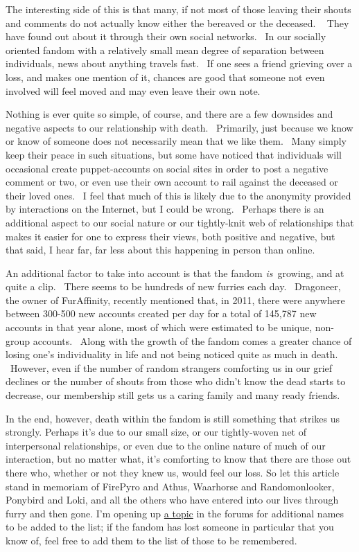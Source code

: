 The interesting side of this is that many, if not most of those leaving
their shouts and comments do not actually know either the bereaved or
the deceased. ~ They have found out about it through their own social
networks. ~In our socially oriented fandom with a relatively small mean
degree of separation between individuals, news about anything travels
fast. ~If one sees a friend grieving over a loss, and makes one mention
of it, chances are good that someone not even involved will feel moved
and may even leave their own note.

Nothing is ever quite so simple, of course, and there are a few
downsides and negative aspects to our relationship with death.
~Primarily, just because we know or know of someone does not necessarily
mean that we like them. ~Many simply keep their peace in such
situations, but some have noticed that individuals will occasional
create puppet-accounts on social sites in order to post a negative
comment or two, or even use their own account to rail against the
deceased or their loved ones. ~I feel that much of this is likely due to
the anonymity provided by interactions on the Internet, but I could be
wrong. ~Perhaps there is an additional aspect to our social nature or
our tightly-knit web of relationships that makes it easier for one to
express their views, both positive and negative, but that said, I hear
far, far less about this happening in person than online.

An additional factor to take into account is that the fandom
\emph{is}~growing, and at quite a clip. ~There seems to be hundreds of
new furries each day. ~Dragoneer, the owner of FurAffinity, recently
mentioned that, in 2011, there were anywhere between 300-500 new
accounts created per day for a total of 145,787 new accounts in that
year alone, most of which were estimated to be unique, non-group
accounts. ~Along with the growth of the fandom comes a greater chance of
losing one's individuality in life and not being noticed quite as much
in death. ~However, even if the number of random strangers comforting us
in our grief declines or the number of shouts from those who didn't know
the dead starts to decrease, our membership still gets us a caring
family and many ready friends.

In the end, however, death within the fandom is still something that
strikes us strongly. Perhaps it's due to our small size, or our
tightly-woven net of interpersonal relationships, or even due to the
online nature of much of our interaction, but no matter what, it's
comforting to know that there are those out there who, whether or not
they knew us, would feel our loss. So let this article stand in memoriam
of FirePyro and Athus, Waarhorse and Randomonlooker, Ponybird and Loki,
and all the others who have entered into our lives through furry and
then gone. I'm opening up
\href{http://forums.adjectivespecies.com/viewtopic.php?f=4\&t=21}{a
topic} in the forums for additional names to be added to the list; if
the fandom has lost someone in particular that you know of, feel free to
add them to the list of those to be remembered.
